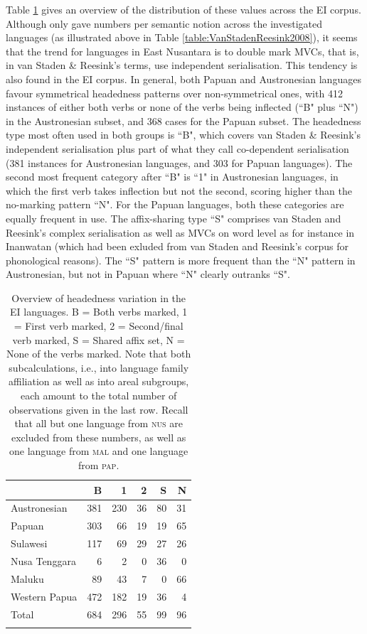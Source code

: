 Table \ref{table:Headedness_overview} gives an overview of the distribution of these values across the EI corpus. Although \citet{vanstaden2008serial} only gave numbers per semantic notion across the investigated languages (as illustrated above in Table \ref{table:VanStadenReesink2008}), it seems that the trend for languages in East Nusantara is to double mark MVCs, that is, in van Staden \& Reesink's terms, use independent serialisation. This tendency is also found in the EI corpus. In general, both Papuan and Austronesian languages favour symmetrical headedness patterns over non-symmetrical ones, with 412 instances of either both verbs or none of the verbs being inflected (``B" plus ``N") in the Austronesian subset, and 368 cases for the Papuan subset. The headedness type most often used in both groups is ``B", which covers van Staden \& Reesink's independent serialisation plus part of what they call co-dependent serialisation (381 instances for Austronesian languages, and 303 for Papuan languages). The second most frequent category after ``B" is ``1" in Austronesian languages, in which the first verb takes inflection but not the second, scoring higher than the no-marking pattern ``N". For the Papuan languages, both these categories are equally frequent in use. The affix-sharing type ``S" comprises van Staden and Reesink's complex serialisation as well as MVCs on word level as for instance in Inanwatan (which had been exluded from van Staden and Reesink's corpus for phonological reasons). The ``S" pattern is more frequent than the ``N" pattern in Austronesian, but not in Papuan where ``N" clearly outranks ``S".

\begin{table}
\begin{tabular}{lrrrrr}
  \lsptoprule
 & B & 1 & 2 & S & N \tabularnewline 
  \hline
  Austronesian & 381 & 230 &  36 &  80 & 31 \tabularnewline
  Papuan & 303 & 66 &  19 &  19 & 65 \tabularnewline
   \hline
  Sulawesi & 117 &  69 &  29 &  27 &  26 \tabularnewline
  Nusa Tenggara & 6 & 2 &  0 &  36 & 0 \tabularnewline
  Maluku & 89 &  43 &   7 &   0 &   66 \tabularnewline 
  Western Papua & 472 & 182 &  19 &  36 &  4 \tabularnewline 
\hline\hline
Total & 684 & 296 & 55 & 99 & 96 \tabularnewline
\lspbottomrule
\end{tabular}
\caption[Headedness variation in the EI corpus]{Overview of headedness variation in the EI languages. B = Both verbs marked, 1 = First verb marked, 2 = Second/final verb marked, S = Shared affix set, N = None of the verbs marked. Note that both subcalculations, i.e., into language family affiliation as well as into areal subgroups, each amount to the total number of observations given in the last row. Recall that all but one language from \textsc{nus} are excluded from these numbers, as well as one language from \textsc{mal} and one language from \textsc{pap}.}
\label{table:Headedness_overview}
\end{table}


